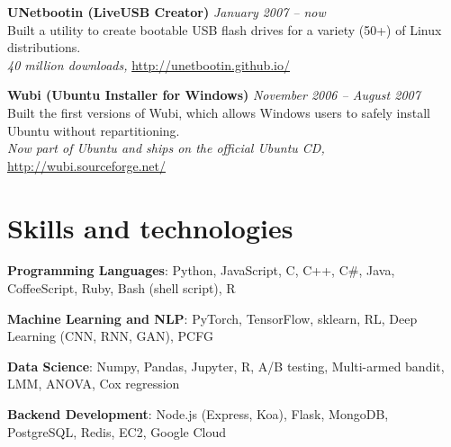\documentclass[margin,line]{resume}
\begin{document}
\begin{resume}
\textbf{UNetbootin (LiveUSB Creator)} \hfill \textsl{January 2007 -- now}\\
Built a utility to create bootable USB flash drives for a variety (50+) of Linux distributions.\\ %
\emph{40 million downloads,} \url{http://unetbootin.github.io/}

\textbf{Wubi (Ubuntu Installer for Windows)} \hfill \textsl{November 2006 -- August 2007}\\
Built the first versions of Wubi, which allows Windows users to safely install Ubuntu without repartitioning. \\ %
\emph{Now part of Ubuntu and ships on the official Ubuntu CD,} \url{http://wubi.sourceforge.net/}

\section{\mysidestyle Skills and technologies}

\textbf{Programming Languages}: Python, JavaScript, C, C++, C\#, Java, CoffeeScript, Ruby, Bash (shell script), R

\vspace{-4mm}

\textbf{Machine Learning and NLP}: PyTorch, TensorFlow, sklearn, RL, Deep Learning (CNN, RNN, GAN), PCFG %

\vspace{-4mm}

\textbf{Data Science}: Numpy, Pandas, Jupyter, R, A/B testing, Multi-armed bandit, LMM, ANOVA, Cox regression

\vspace{-4mm}

\textbf{Backend Development}: Node.js (Express, Koa), Flask, MongoDB, PostgreSQL, Redis, EC2, Google Cloud

\vspace{-4mm}


\end{resume}
\end{document}
